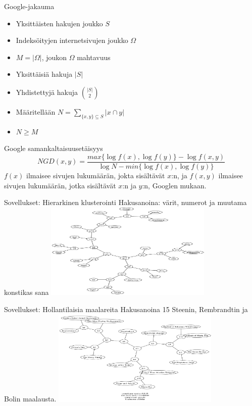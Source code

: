 \documentclass{beamer}
\begin{document}
\begin{frame}{Google-jakauma}
  \begin{itemize}
    \item Yksittäisten hakujen joukko $S$
    \item Indeksöityjen internetsivujen joukko $\Omega$
    \item $M = |\Omega|$, joukon $\Omega$ mahtavuus
    \item Yksittäisiä hakuja $|S|$
    \item Yhdistettyjä hakuja $\binom{|S|}{2}$
    \item Määritellään $N = \sum_{\{x,y\}\subseteq S} |x \cap y|$
    \item $N \geq M$
  \end{itemize}
\end{frame}
\begin{frame}{Google samankaltaisuusetäisyys}
  \[
    NGD(x,y) = \frac{max\{\log f(x),\log f(y)\} - \log f(x,y)}{\log N - min\{\log f (x), \log f (y)\}}
  \]
    $f(x)$ ilmaisee sivujen lukumäärän, jokta sisältävät $x$:n, ja $f (x, y) $ ilmaisee sivujen lukumäärän, jotka sisältävät $x$:n ja $y$:n, Googlen mukaan.
\end{frame}
\begin{frame}{Sovellukset: Hierarkinen klusterointi}
  Hakusanoina: värit, numerot ja muutama konstikas sana
  \centering
  \includegraphics[width=8cm,keepaspectratio=true]{google-000}
\end{frame}

\begin{frame}{Sovellukset: Hollantilaisia maalareita}
  Hakusanoina 15 Steenin, Rembrandtin ja Bolin maalausta.
  \centering
  \includegraphics[width=8cm,keepaspectratio=true]{google-001}
\end{frame}
\end{document}
